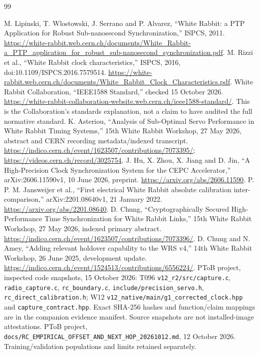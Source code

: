 \documentclass[11pt,letterpaper]{article}
\newcommand{\code}[1]{\texttt{#1}}
\begin{document}
\begin{thebibliography}{99}
\raggedright
{} M. Lipinski, T. Wlostowski, J. Serrano and P. Alvarez, ``White Rabbit: a PTP Application for Robust Sub-nanosecond Synchronization,'' ISPCS, 2011. \url{https://white-rabbit.web.cern.ch/documents/White_Rabbit-a_PTP_application_for_robust_sub-nanosecond_synchronization.pdf}.
 M. Rizzi et al., ``White Rabbit clock characteristics,'' ISPCS, 2016, doi:10.1109/ISPCS.2016.7579514. \url{https://white-rabbit.web.cern.ch/documents/White_Rabbit_Clock_Characteristics.pdf}.
 White Rabbit Collaboration, ``IEEE1588 Standard,'' checked 15 October 2026. \url{https://white-rabbit-collaboration-website.web.cern.ch/ieee1588-standard/}. This is the Collaboration's standards explanation, not a claim to have audited the full normative standard.
 K. Asteriou, ``Analysis of Sub-Optimal Servo Performance in White Rabbit Timing Systems,'' 15th White Rabbit Workshop, 27 May 2026, abstract and CERN recording metadata/indexed transcript. \url{https://indico.cern.ch/event/1623507/contributions/7073395/}; \url{https://videos.cern.ch/record/3025754}.
 J. Hu, X. Zhou, X. Jiang and D. Jin, ``A High-Precision Clock Synchronization System for the CEPC Accelerator,'' arXiv:2606.11590v1, 10 June 2026, preprint. \url{https://arxiv.org/abs/2606.11590}.
 P. P. M. Jansweijer et al., ``First electrical White Rabbit absolute calibration inter-comparison,'' arXiv:2201.08640v1, 21 January 2022. \url{https://arxiv.org/abs/2201.08640}.
 D. Chung, ``Cryptographically Secured High-Performance Time Synchronization for White Rabbit Links,'' 15th White Rabbit Workshop, 27 May 2026, indexed primary abstract. \url{https://indico.cern.ch/event/1623507/contributions/7073396/}.
 D. Chung and N. Amey, ``Adding relevant holdover capability to the WRS v4,'' 14th White Rabbit Workshop, 26 June 2025, development update. \url{https://indico.cern.ch/event/1524513/contributions/6556224/}.
 PToB project, inspected code snapshots, 15 October 2026: T096 \code{v12\_r2/src/capture.c}, \code{radio\_capture.c}, \code{rc\_boundary.c}, \code{include/precision\_servo.h}, \code{rc\_direct\_calibration.h}; W12 \code{v12\_native/main/g1\_corrected\_clock.hpp} and \code{capture\_contract.hpp}. Exact SHA-256 hashes and function/claim mappings are in the companion evidence manifest. Source snapshots are not installed-image attestations.
 PToB project, \code{docs/RC\_EMPIRICAL\_OFFSET\_AND\_NEXT\_HOP\_20261012.md}, 12 October 2026. Training/validation populations and limits retained separately.

\end{thebibliography}
\end{document}
